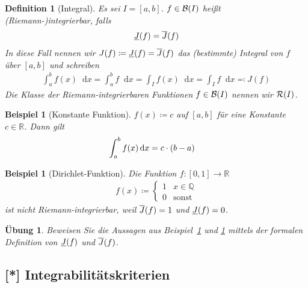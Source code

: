 \documentclass[11pt, twoside, a4paper]{article}
\theoremstyle{plain}
\newtheorem{definition}[blockelement]{Definition}
\newtheorem{uebung}[blockelement]{Übung}
\newtheorem{beispiel}[blockelement]{Beispiel}
\numberwithin{equation}{subsection}
\newcommand{\pair}[1]{\left(#1\right)}
\newcommand{\of}[1]{\mathopen{}\mathclose{}\bgroup\left(#1\aftergroup\egroup\right)}
\newcommand{\interv}[1]{\left[#1\right]}
\newcommand{\fromto}{\rightarrow{}}
\newcommand{\definedas}[0]{\coloneqq}
\newcommand{\definedasbackwards}[0]{\eqqcolon}
\newcommand{\dif}{\mathop{}\!\mathrm{d}}
\newcommand{\ov}[1]{\overline{#1}}
\newcommand{\un}[1]{\underline{#1}}
\newcommand{\R}{\mathbb{R}}
\newcommand{\Q}{\mathbb{Q}}
\newcommand{\mR}{\mathcal{R}}
\newcommand{\mB}{\mathcal{B}}
\begin{document}
    \begin{definition}[Integral]
        Es sei $I=\interv{a,b}$. $f\in \mB\of{I}$ heißt (Riemann-)integrierbar, falls
        \begin{align*}
            \underline{J}\of{f} = \overline{J}\of{f}
        \end{align*}
        In diese Fall nennen wir $J(f) \definedas \underline{J}\of{f} = \overline{J}\of{f}$ das (bestimmte) Integral von $f$ über $\interv{a,b}$ und schreiben
        \begin{align*}
            \int_{a}^{b} f(x) \dif x = \int_{a}^{b} f\dif x = \int_{I} f(x)\dif x = \int_{I} f\dif x \definedasbackwards J(f)
        \end{align*}
        Die Klasse der Riemann-integrierbaren Funktionen $f\in \mB\of{I}$ nennen wir $\mR\of{I}$.
    \end{definition}

    \begin{beispiel}[Konstante Funktion]
        \marginnote{[18. Apr]}
        \label{beispiel:int-konstant}
        $f(x) \definedas c$ auf $\interv{a,b}$ für eine Konstante $c\in\R$. Dann gilt
        \begin{align*}
            \int_{a}^{b} f\of{x} \dif x &= c\cdot\pair{b-a}
        \end{align*}
    \end{beispiel}

    \begin{beispiel}[Dirichlet-Funktion]
        \label{beispiel:int-dirichlet}
        Die Funktion $f: \interv{0,1}\fromto\R$
        \begin{align*}
            f(x) \definedas \begin{cases}
                                1 &x\in \Q\\
                                0 &\text{sonst}
            \end{cases}
        \end{align*}
        ist nicht Riemann-integrierbar, weil $\overline{J}\of{f} = 1$ und $\underline{J}\of{f} = 0$.
    \end{beispiel}

    \begin{uebung}
        Beweisen Sie die Aussagen aus Beispiel~\ref{beispiel:int-konstant} und \ref{beispiel:int-dirichlet} mittels der formalen Definition von $\un{J}\of{f}$ und $\ov{J}\of{f}$.
    \end{uebung}

    \subsection{[*] Integrabilitätskriterien}
\end{document}
